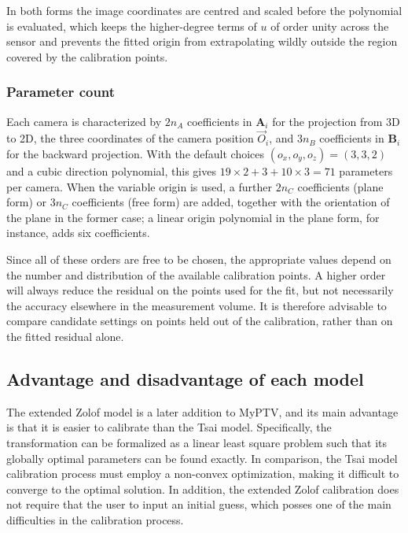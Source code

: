 \documentclass[10pt,a4paper]{article}
\begin{document}
In both forms the image coordinates are centred and scaled before the polynomial is evaluated, which keeps the higher-degree terms of $u$ of order unity across the sensor and prevents the fitted origin from extrapolating wildly outside the region covered by the calibration points.

\subsubsection{Parameter count}
Each camera is characterized by $2 n_A$ coefficients in $\mathbf{A}_i$ for the projection from 3D to 2D, the three coordinates of the camera position $\vec{O}_i$, and $3 n_B$ coefficients in $\mathbf{B}_i$ for the backward projection. With the default choices $(o_x,o_y,o_z) = (3,3,2)$ and a cubic direction polynomial, this gives $19\times2 + 3 + 10\times3 = 71$ parameters per camera. When the variable origin is used, a further $2 n_C$ coefficients (plane form) or $3 n_C$ coefficients (free form) are added, together with the orientation of the plane in the former case; a linear origin polynomial in the plane form, for instance, adds six coefficients.

Since all of these orders are free to be chosen, the appropriate values depend on the number and distribution of the available calibration points. A higher order will always reduce the residual on the points used for the fit, but not necessarily the accuracy elsewhere in the measurement volume. It is therefore advisable to compare candidate settings on points held out of the calibration, rather than on the fitted residual alone.




\subsection{Advantage and disadvantage of each model}

The extended Zolof model is a later addition to MyPTV, and its main advantage is that it is easier to calibrate than the Tsai model. Specifically, the transformation can be formalized as a linear least square problem such that its globally optimal parameters can be found exactly. In comparison, the Tsai model calibration process must employ a non-convex optimization, making it difficult to converge to the optimal solution. In addition, the extended Zolof calibration does not require that the user to input an initial guess, which posses one of the main difficulties in the calibration process. 
\end{document}
